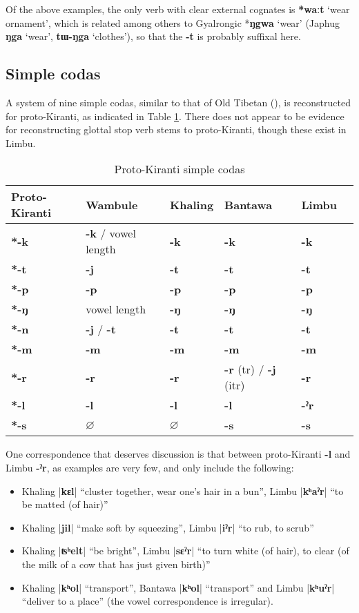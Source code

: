 \documentclass[oldfontcommands,oneside,a4paper,11pt]{article}
\newcommand{\ipa}[1]{\textbf{{\phon\mbox{#1}}}} %
\newcommand{\dhatu}[2]{|\ipa{#1}| ``#2''}
\begin{document}
Of the above examples, the only verb with clear external cognates is \ipa{*waːt} `wear ornament', which is related among others to Gyalrongic *\ipa{ŋgwa} `wear' (Japhug \ipa{ŋga} `wear', \ipa{tɯ-ŋga} `clothes'), so that the \ipa{-t} is probably suffixal here. 

\subsection{Simple codas} \label{sec:codas}
A system of nine simple codas, similar to that of Old Tibetan (\citealt{hill10synchronic}), is reconstructed for proto-Kiranti, as indicated in Table \ref{tab:codas}. There does not appear to be evidence for reconstructing glottal stop verb stems to proto-Kiranti, though these exist in Limbu.

\begin{table}[H]
\caption{Proto-Kiranti simple codas} \centering \label{tab:codas}
\begin{tabular}{llllll}
\toprule
Proto-Kiranti & Wambule & Khaling & Bantawa & Limbu \\
\midrule
\ipa{*-k} & \ipa{-k} / vowel length& \ipa{-k} & \ipa{-k} & \ipa{-k}  \\
\ipa{*-t} & \ipa{-j} & \ipa{-t} & \ipa{-t} & \ipa{-t}  \\
\ipa{*-p} & \ipa{-p} & \ipa{-p} & \ipa{-p} & \ipa{-p}  \\
\midrule
\ipa{*-ŋ} & vowel length & \ipa{-ŋ} & \ipa{-ŋ} & \ipa{-ŋ}  \\
\ipa{*-n} & \ipa{-j} /  \ipa{-t} & \ipa{-t} & \ipa{-t} & \ipa{-t}  \\
\ipa{*-m} & \ipa{-m} & \ipa{-m} & \ipa{-m} & \ipa{-m}  \\
\midrule
\ipa{*-r} &  \ipa{-r}  & \ipa{-r} & \ipa{-r} (tr) / \ipa{-j} (itr) & \ipa{-r}  \\
\ipa{*-l} & \ipa{-l}  & \ipa{-l} & \ipa{-l} & \ipa{-ˀr}  \\
\ipa{*-s} &$\varnothing$ & $\varnothing$ & \ipa{-s} & \ipa{-s}  \\
\bottomrule
\end{tabular}
\end{table}

One correspondence that deserves discussion is that between proto-Kiranti \ipa{-l} and Limbu \ipa{-ˀr}, as examples are very few, and only include the following:

\begin{itemize}
\item  Khaling \dhatu{kɛl}{cluster together, wear one's hair in a bun}, Limbu \dhatu{kʰaˀr}{to be matted (of hair)}  			 
\item  Khaling \dhatu{jil}{make soft by squeezing}, Limbu \dhatu{iˀr}{to rub, to scrub}  		 
\item   Khaling \dhatu{ʦʰelt}{be bright}, Limbu \dhatu{sɛˀr}{to turn white (of hair), to clear (of the milk of a cow that has just given birth)}  
\item Khaling \dhatu{kʰol}{transport}, Bantawa	  \dhatu{kʰol}{transport}	 and	 Limbu \dhatu{kʰuˀr}{deliver to a place}	  (the vowel correspondence is irregular).
\end{itemize}
\end{document}
